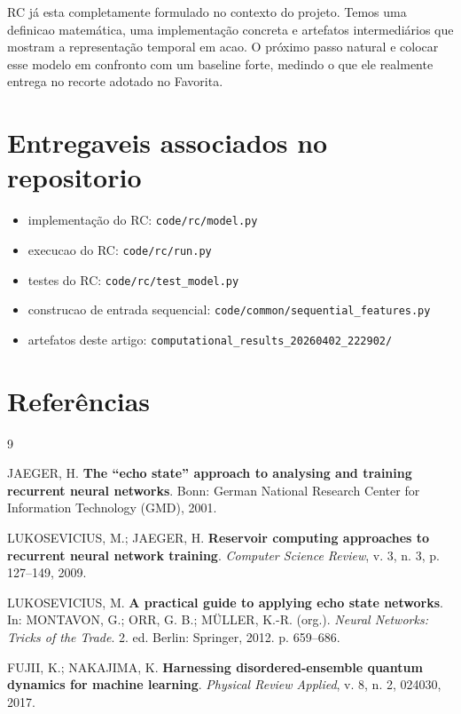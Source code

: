 \documentclass[12pt]{article}
\providecommand{\tightlist}{%
              \setlength{\itemsep}{0pt}\setlength{\parskip}{0pt}}
\begin{document}
RC já esta completamente formulado no contexto do projeto. Temos uma definicao matemática, uma implementação concreta e artefatos intermediários que mostram a representação temporal em acao. O próximo passo natural e colocar esse modelo em confronto com um baseline forte, medindo o que ele realmente entrega no recorte adotado no Favorita.

\section*{Entregaveis associados no repositorio}\label{entregaveis-associados-no-repositorio}

\begin{itemize}
\tightlist
\item
  implementação do RC: \texttt{code/rc/model.py}
\item
  execucao do RC: \texttt{code/rc/run.py}
\item
  testes do RC: \texttt{code/rc/test\_model.py}
\item
  construcao de entrada sequencial: \texttt{code/common/sequential\_features.py}
\item
  artefatos deste artigo: \texttt{computational\_results\_20260402\_222902/}
\end{itemize}

\section{Referências}\label{referencias}

\begin{thebibliography}{9}

JAEGER, H. \textbf{The ``echo state'' approach to analysing and training recurrent neural networks}. Bonn: German National Research Center for Information Technology (GMD), 2001.

LUKOSEVICIUS, M.; JAEGER, H. \textbf{Reservoir computing approaches to recurrent neural network training}. \emph{Computer Science Review}, v. 3, n. 3, p. 127--149, 2009.

LUKOSEVICIUS, M. \textbf{A practical guide to applying echo state networks}. In: MONTAVON, G.; ORR, G. B.; MÜLLER, K.-R. (org.). \emph{Neural Networks: Tricks of the Trade}. 2. ed. Berlin: Springer, 2012. p. 659--686.

FUJII, K.; NAKAJIMA, K. \textbf{Harnessing disordered-ensemble quantum dynamics for machine learning}. \emph{Physical Review Applied}, v. 8, n. 2, 024030, 2017.

\end{thebibliography}

            
\end{document}
